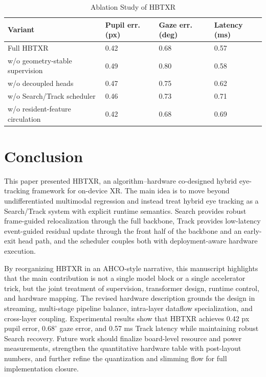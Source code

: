 \documentclass[journal]{IEEEtran}
\begin{document}
\begin{table}[t]
\caption{Ablation Study of HBTXR}
\label{tab:ablation}
\centering
\footnotesize
\begin{tabularx}{\columnwidth}{@{}L{0.48\columnwidth}C{0.14\columnwidth}C{0.14\columnwidth}C{0.14\columnwidth}@{}}
\toprule
Variant & Pupil err. (px) & Gaze err. (deg) & Latency (ms) \\
\midrule
Full HBTXR & 0.42 & 0.68 & 0.57 \\
w/o geometry-stable supervision & 0.49 & 0.80 & 0.58 \\
w/o decoupled heads & 0.47 & 0.75 & 0.62 \\
w/o Search/Track scheduler & 0.46 & 0.73 & 0.71 \\
w/o resident-feature circulation & 0.42 & 0.68 & 0.69 \\
\bottomrule
\end{tabularx}
\end{table}

\section{Conclusion}
This paper presented HBTXR, an algorithm--hardware co-designed hybrid eye-tracking framework for on-device XR. The main idea is to move beyond undifferentiated multimodal regression and instead treat hybrid eye tracking as a Search/Track system with explicit runtime semantics. Search provides robust frame-guided relocalization through the full backbone, Track provides low-latency event-guided residual update through the front half of the backbone and an early-exit head path, and the scheduler couples both with deployment-aware hardware execution.

By reorganizing HBTXR in an AHCO-style narrative, this manuscript highlights that the main contribution is not a single model block or a single accelerator trick, but the joint treatment of supervision, transformer design, runtime control, and hardware mapping. The revised hardware description grounds the design in streaming, multi-stage pipeline balance, intra-layer dataflow specialization, and cross-layer coupling. Experimental results show that HBTXR achieves 0.42 px pupil error, $0.68^{\circ}$ gaze error, and 0.57 ms Track latency while maintaining robust Search recovery. Future work should finalize board-level resource and power measurements, strengthen the quantitative hardware table with post-layout numbers, and further refine the quantization and slimming flow for full implementation closure.
\end{document}
